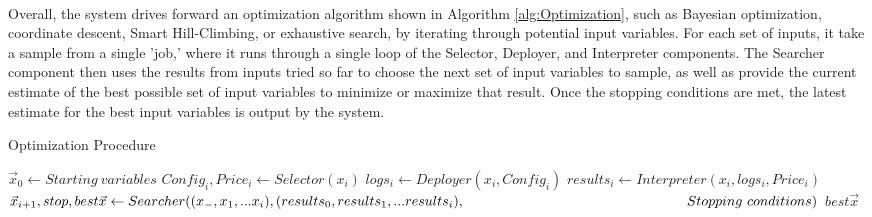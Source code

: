 \documentclass{report}
\begin{document}
\paragraph{}
Overall, the system drives forward an optimization algorithm shown in Algorithm \ref{alg:Optimization}, such as Bayesian optimization, coordinate descent, Smart Hill-Climbing, or exhaustive search, by iterating through potential input variables. For each set of inputs, it take a sample from a single 'job,' where it runs through a single loop of the Selector, Deployer, and Interpreter components. The Searcher component then uses the results from inputs tried so far to choose the next set of input variables to sample, as well as provide the current estimate of the best possible set of input variables to minimize or maximize that result. Once the stopping conditions are met, the latest estimate for the best input variables is output by the system.

\begin{algorithm}
\caption{Optimization Procedure}
\label{alg:Optimization}
\begin{algorithmic}
\State $\vec{x}_{0}\gets Starting \ variables$
\State $Config_i, Price_i\gets Selector(x_i)$
\State $logs_i \gets Deployer(x_i, Config_i)$
\State $results_i \gets Interpreter(x_i, logs_i, Price_i)$
\State $\vec{x}_{i+1}, stop, best\vec{x} \gets Searcher((x_-, x_1,...x_i), (results_0, results_1,...results_i),\newline
\hspace*{5.6cm}Stopping\ conditions)$
\State \Return $best\vec{x}$
\EndIf
\EndFor
\EndProcedure
\end{algorithmic}
\end{algorithm}
 
\end{document}

